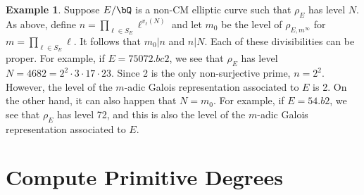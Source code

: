 \documentclass[11pt,reqno]{amsart}
\theoremstyle{plain}
\theoremstyle{definition}
\newtheorem{example}[theorem]{Example}
\newcommand{\Q}{\bQ}
\newcommand{\Z}{\bZ}
\newcommand{\abbey}[1]{\textcolor{blue}{Abbey: #1}}
\newcommand{\sachi}[1]{\textcolor{purple}{Sachi: #1}}
\newcommand{\travis}[1]{\textcolor{orange}{Travis: #1}}
\begin{document}
  \begin{example}
Suppose $E/\Q$ is a non-CM elliptic curve such that $\rho_{E}$ has level $N$. As above, define $n=\prod_{\ell \in S_E} \ell^{v_{\ell}(N)}$ and let $m_0$ be the level of $\rho_{E,m^{\infty}}$ for $m= \prod_{\ell \in S_E} \ell$. It follows that $m_0| n$ and $n | N$. Each of these divisibilities can be proper. For example, if $E=75072.bc2$, we see that $\rho_E$ has level $N=4682=2^2 \cdot 3 \cdot 17 \cdot 23$. Since 2 is the only non-surjective prime, $n=2^2$. However, the level of the $m$-adic Galois representation associated to $E$ is 2. On the other hand, it can also happen that $N=m_0$. For example, if $E=54.b2$, we see that $\rho_E$ has level 72, and this is also the level of the $m$-adic Galois representation associated to $E$.
\end{example}



\section{Compute Primitive Degrees}
\label{sec:primitivedeg}
\end{document}
